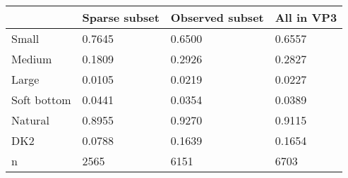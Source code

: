 \begin{tabular}{llll}
\toprule
 & Sparse subset & Observed subset & All in VP3 \\
\midrule
Small & 0.7645 & 0.6500 & 0.6557 \\
Medium & 0.1809 & 0.2926 & 0.2827 \\
Large & 0.0105 & 0.0219 & 0.0227 \\
Soft bottom & 0.0441 & 0.0354 & 0.0389 \\
Natural & 0.8955 & 0.9270 & 0.9115 \\
DK2 & 0.0788 & 0.1639 & 0.1654 \\
n & 2565 & 6151 & 6703 \\
\bottomrule
\end{tabular}
